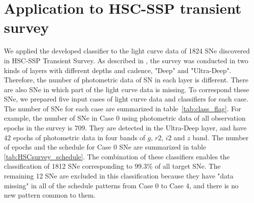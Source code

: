 \documentclass[useamsfonts]{pasj01}
\begin{document}
\section{Application to HSC-SSP transient survey}
\label{sec:h}
%
We applied the developed classifier to the light curve data of 1824 SNe discovered in HSC-SSP Transient Survey.
As described in \citet{yasuda19a}, the survey %
was conducted in two kinds of layers with different depths and cadence, 
"Deep" and "Ultra-Deep".
Therefore, the number of photometric data of SN in each layer is different.
There are also SNe in which part of the light curve data is missing.
To correspond these SNe, we prepared five input cases of light curve data and classifiers for each case.
The number of SNe for each case are summarized in table\ \ref{tab:class_flag}.
For example, the number of SNe in Case 0 using photometric data of all observation epochs in the survey is 709.
They are detected in the Ultra-Deep layer, and have 42 epochs of photometric data in four bands of $g$, $r2$, $i2$ and $z$ band.
The number of epochs and the schedule for Case 0 SNe are summarized in table \ref{tab:HSCsurvey_schedule}.
The combination of these classifiers enables the classification of 1812 SNe corresponding to 99.3\% of all target SNe.
The remaining 12 SNe are excluded in this classification because they have "data missing" in all of the schedule patterns from Case 0 to Case 4, and there is no new pattern common to them.
\end{document}
